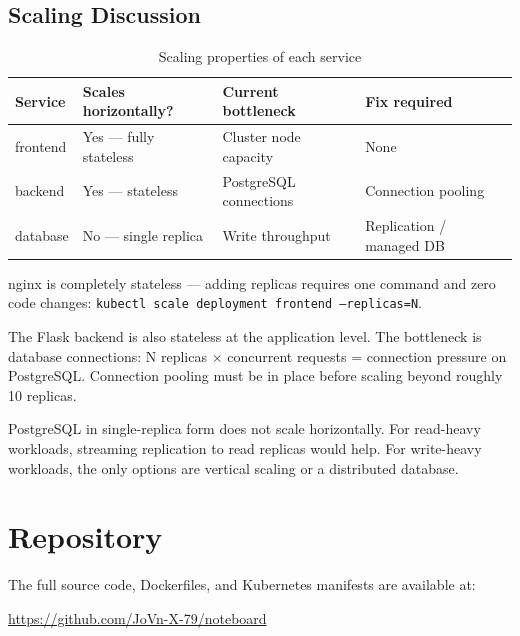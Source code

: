 \documentclass[12pt,a4paper]{article}
\begin{document}
\subsection{Scaling Discussion}

\begin{table}[h]
\centering
\begin{tabular}{@{}p{2.2cm}p{3.8cm}p{3.8cm}p{3.2cm}@{}}
\toprule
\textbf{Service} & \textbf{Scales horizontally?} & \textbf{Current bottleneck} & \textbf{Fix required} \\
\midrule
frontend  & Yes --- fully stateless & Cluster node capacity & None \\
backend   & Yes --- stateless & PostgreSQL connections & Connection pooling \\
database  & No --- single replica & Write throughput & Replication / managed DB \\
\bottomrule
\end{tabular}
\caption{Scaling properties of each service}
\end{table}

nginx is completely stateless --- adding replicas requires one command and zero code changes: \texttt{kubectl scale deployment frontend --replicas=N}.

The Flask backend is also stateless at the application level. The bottleneck is database connections: N replicas $\times$ concurrent requests = connection pressure on PostgreSQL. Connection pooling must be in place before scaling beyond roughly 10 replicas.

PostgreSQL in single-replica form does not scale horizontally. For read-heavy workloads, streaming replication to read replicas would help. For write-heavy workloads, the only options are vertical scaling or a distributed database.

\section{Repository}

The full source code, Dockerfiles, and Kubernetes manifests are available at:

\begin{center}
\url{https://github.com/JoVn-X-79/noteboard}
\end{center}
\end{document}
